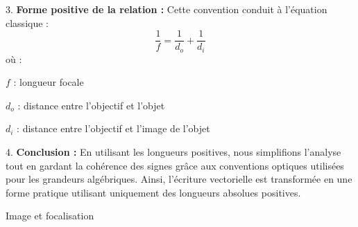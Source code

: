 \documentclass[answers]{exam}
\begin{document}
\begin{questions}
\begin{solution}
3. \textbf{Forme positive de la relation :} 
   Cette convention conduit à l'équation classique :
   \[
   \frac{1}{f} = \frac{1}{d_o} + \frac{1}{d_i}
   \]
   où :

   \begin{addmargin}[4em]{1em}
   \begin{compactitem}
       \item [$f$] : longueur focale
       \item [$d_o$] : distance entre l'objectif et l'objet
       \item [$d_i$] : distance entre l'objectif et l'image de l'objet
   \end{compactitem}
   \end{addmargin}

4. \textbf{Conclusion :} 
   En utilisant les longueurs positives, nous simplifions l'analyse tout en gardant la cohérence des signes grâce aux conventions optiques utilisées pour les grandeurs algébriques. Ainsi, l'écriture vectorielle est transformée en une forme pratique utilisant uniquement des longueurs absolues positives.
\end{solution}

\question[4] Image et focalisation




\end{questions}
\end{document}
